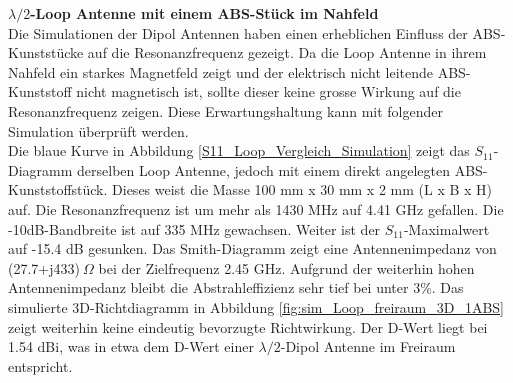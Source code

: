 \textbf{$\lambda/2$-Loop Antenne mit einem ABS-Stück im Nahfeld}\\
Die Simulationen der Dipol Antennen haben einen erheblichen Einfluss der ABS-Kunststücke auf die Resonanzfrequenz gezeigt. Da die Loop Antenne in ihrem Nahfeld ein starkes Magnetfeld zeigt und der elektrisch nicht leitende ABS-Kunststoff nicht magnetisch ist, sollte dieser keine grosse Wirkung auf die Resonanzfrequenz zeigen. Diese Erwartungshaltung kann mit folgender Simulation überprüft werden.\\ Die blaue Kurve in Abbildung \ref{S11_Loop_Vergleich_Simulation} zeigt das $S_{11}$-Diagramm derselben Loop Antenne, jedoch mit einem direkt angelegten ABS-Kunststoffstück. Dieses weist die Masse 100 mm x 30 mm x 2 mm (L x B x H) auf. Die Resonanzfrequenz ist um mehr als 1430 MHz auf 4.41 GHz gefallen. Die -10dB-Bandbreite ist auf 335 MHz gewachsen. Weiter ist der $S_{11}$-Maximalwert auf -15.4 dB gesunken. Das Smith-Diagramm zeigt eine Antennenimpedanz von (27.7+j433)$\ \Omega$ bei der Zielfrequenz 2.45 GHz. Aufgrund der weiterhin hohen Antennenimpedanz bleibt die Abstrahleffizienz sehr tief bei unter $3\%$. Das simulierte 3D-Richtdiagramm in Abbildung \ref{fig:sim_Loop_freiraum_3D_1ABS} zeigt weiterhin keine eindeutig bevorzugte Richtwirkung. Der D-Wert liegt bei 1.54 dBi, was in etwa dem D-Wert einer $\lambda/2$-Dipol Antenne im Freiraum entspricht.\\




